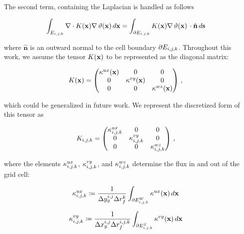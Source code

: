 The second term, containing the Laplacian is handled as follows
\begin{linenomath*}\begin{equation*}
    \int_{E_{i,j,k}} \nabla\cdot K(\mathbf{x})\nabla\,\vartheta(\mathbf{x})\,d\mathbf{x}
    =\int_{\partial E_{i,j,k}} K(\mathbf{x})\nabla\,\vartheta(\mathbf{x})\,
    \cdot \hat{\mathbf{n}} \, d\mathbf{s}
\end{equation*}\end{linenomath*}
where $\hat{\mathbf{n}}$ is an outward normal to the cell boundary
$\partial E_{i,j,k}$.
Throughout this work, we assume the tensor $K(\mathbf{x})$ to be represented as the
diagonal matrix:
\begin{linenomath*}\begin{equation*}
    K(\mathbf{x}) =
    \begin{pmatrix}
        \kappa^{ux}(\mathbf{x}) & 0 & 0 \\
        0 &\kappa^{vy}(\mathbf{x}) & 0 \\
        0 & 0 & \kappa^{wz}(\mathbf{x}) \\
    \end{pmatrix} \, ,
\end{equation*}\end{linenomath*}
which could be generalized in future work.
We represent the discretized form of this tensor as
\begin{linenomath*}\begin{equation*}
    K_{i,j,k} =
    \begin{pmatrix}
        \kappa^{ux}_{i,j,k} & 0 & 0 \\
        0 & \kappa^{vy}_{i,j,k} & 0 \\
        0 & 0 & \kappa^{wz}_{i,j,k} \\
    \end{pmatrix} \, ,
\end{equation*}\end{linenomath*}
where the elements $\kappa^{ux}_{i,j,k}$, $\kappa^{vy}_{i,j,k}$, and $\kappa^{wz}_{i,j,k}$
determine the flux in and out of the grid cell:
\begin{linenomath*}\begin{equation*}
    \kappa^{ux}_{{i,j,k}} \coloneqq \dfrac{1}{\Delta y_g^{i,j}\Delta r_f^{k}}
    \int_{\partial E_{{i,j,k}}^{W}} \kappa^{ux}(\mathbf{x})\,d\mathbf{x}
\end{equation*}\end{linenomath*}
\begin{linenomath*}\begin{equation*}
    \kappa^{vy}_{{i,j,k}} \coloneqq \dfrac{1}{\Delta x_g^{i,j}\Delta r_f^{{i,j,k}}}
    \int_{\partial E_{{i,j,k}}^{S}} \kappa^{vy}(\mathbf{x})\,d\mathbf{x}
\end{equation*}\end{linenomath*}

